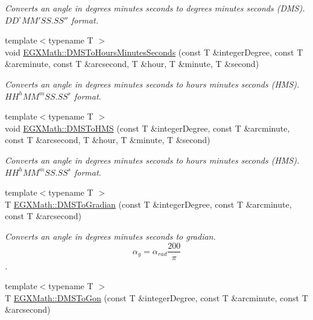 \begin{DoxyCompactItemize}
\begin{DoxyCompactList}\small\item\em Converts an angle in degrees minutes seconds to degrees minutes seconds (D\+MS). ${DD}^{\circ}{MM}'{SS.SS}''$ format. \end{DoxyCompactList}\item 
{\footnotesize template$<$typename T $>$ }\\void \mbox{\hyperlink{group___e_g_x_math-_angle_conversions-_d_m_s_ga62f95d8bf79b8788ef6d1003f8d6a65f}{E\+G\+X\+Math\+::\+D\+M\+S\+To\+Hours\+Minutes\+Seconds}} (const T \&integer\+Degree, const T \&arcminute, const T \&arcsecond, T \&hour, T \&minute, T \&second)
\begin{DoxyCompactList}\small\item\em Converts an angle in degrees minutes seconds to hours minutes seconds (H\+MS). ${HH}^h{MM}^m{SS.SS}^s$ format. \end{DoxyCompactList}\item 
{\footnotesize template$<$typename T $>$ }\\void \mbox{\hyperlink{group___e_g_x_math-_angle_conversions-_d_m_s_ga570e90c6555753cccfcaa55f0e6374ac}{E\+G\+X\+Math\+::\+D\+M\+S\+To\+H\+MS}} (const T \&integer\+Degree, const T \&arcminute, const T \&arcsecond, T \&hour, T \&minute, T \&second)
\begin{DoxyCompactList}\small\item\em Converts an angle in degrees minutes seconds to hours minutes seconds (H\+MS). ${HH}^h{MM}^m{SS.SS}^s$ format. \end{DoxyCompactList}\item 
{\footnotesize template$<$typename T $>$ }\\T \mbox{\hyperlink{group___e_g_x_math-_angle_conversions-_d_m_s_ga2abca0654499b46df6ab9592f95b9ef1}{E\+G\+X\+Math\+::\+D\+M\+S\+To\+Gradian}} (const T \&integer\+Degree, const T \&arcminute, const T \&arcsecond)
\begin{DoxyCompactList}\small\item\em Converts an angle in degrees minutes seconds to gradian. \[\alpha_{g}=\alpha_{rad}\frac{200}{\pi}\]. \end{DoxyCompactList}\item 
{\footnotesize template$<$typename T $>$ }\\T \mbox{\hyperlink{group___e_g_x_math-_angle_conversions-_d_m_s_ga47fe1b9127ec6b73ee759eef038a8eb6}{E\+G\+X\+Math\+::\+D\+M\+S\+To\+Gon}} (const T \&integer\+Degree, const T \&arcminute, const T \&arcsecond)

\end{DoxyCompactItemize}
